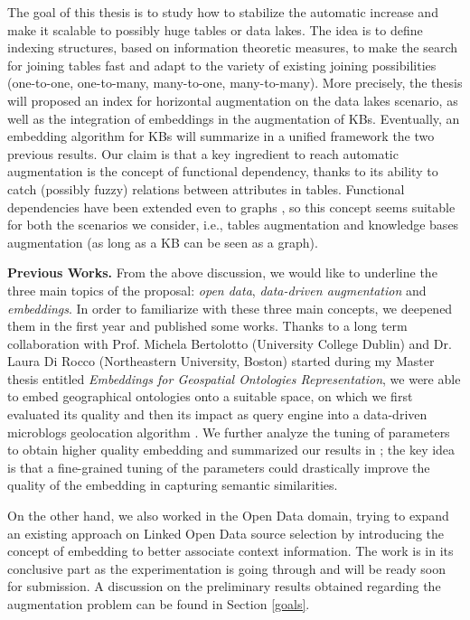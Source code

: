 The goal of this thesis is to study how to stabilize the automatic increase and make it scalable to possibly huge tables or data lakes. The idea is to define indexing structures, based on information theoretic measures, to make the search for joining tables fast and adapt to the variety of existing joining possibilities (one-to-one, one-to-many, many-to-one, many-to-many). More precisely, the thesis will proposed an index for horizontal augmentation on the data lakes scenario, as well as the integration of embeddings in the augmentation of KBs. Eventually, an embedding algorithm for KBs will summarize in a  unified framework the two previous results. Our claim is that a key ingredient to reach automatic augmentation is the concept of functional dependency, thanks to its ability to catch (possibly fuzzy) relations between attributes in tables. Functional dependencies have been extended even to graphs \cite{fan2016functional}, so this concept seems suitable for both the scenarios we consider, i.e., tables augmentation and knowledge bases augmentation (as long as a KB can be seen as a graph). 


\bigbreak
\textbf{Previous Works.} From the above discussion, we would like to underline the three main topics of the proposal: \textit{open data}, \textit{data-driven augmentation} and \textit{embeddings}. In order to familiarize with these three main concepts, we deepened them in the first year and published some works. Thanks to a long term collaboration with Prof. Michela Bertolotto (University College Dublin) and Dr. Laura Di Rocco (Northeastern University, Boston) started during my Master thesis entitled \textit{Embeddings for Geospatial Ontologies Representation}, we were able to embed geographical ontologies onto a suitable space, on which we first evaluated its quality \cite{dassereto2019evaluating} and then its impact as query engine into a data-driven microblogs geolocation algorithm \cite{di2020sherloc}. We further analyze the tuning of parameters to obtain higher quality embedding and summarized our results in \cite{dassereto2020tuning}; the key idea is that a fine-grained tuning of the parameters could drastically improve the quality of the embedding in capturing semantic similarities.

On the other hand, we also worked in the Open Data domain, trying to expand an existing approach on Linked Open Data source selection \cite{beyza2019linked} by introducing the concept of embedding to better associate context information. The work is in its conclusive part as the experimentation is going through and will be ready soon for submission. A discussion on the preliminary results obtained regarding the augmentation problem can be found in Section \ref{goals}.

